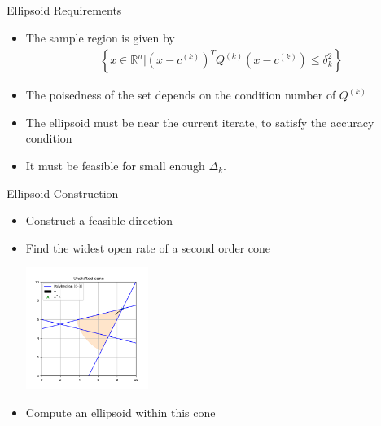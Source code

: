 \documentclass{beamer}
\newcommand{\Rn}{\mathbb R ^ {n}}
\newcommand{\dk}{{\Delta_k}}
\begin{document}
\begin{frame}{Ellipsoid Requirements}
	\begin{itemize}
		\item The sample region is given by
\begin{align*}
\left\{x \in \Rn \bigg | \left(x - c^{(k)}\right)^TQ^{(k)}\left(x - c^{(k)}\right) \le \delta_k^2 \right\}
\end{align*}
		\item The poisedness of the set depends on the condition number of $Q^{(k)}$
		\item The ellipsoid must be near the current iterate, to satisfy the accuracy condition
		\item It must be feasible for small enough $\dk$.
	\end{itemize}
\end{frame}


\begin{frame}{Ellipsoid Construction}
	\begin{itemize}
		\item Construct a feasible direction
		\item Find the widest open rate of a second order cone
\begin{center}
	\includegraphics[width=150px]{images/unshifted_cone.png}
\end{center}
		\item Compute an ellipsoid within this cone
	\end{itemize}
\end{frame}

% 	

% 
\end{document}
